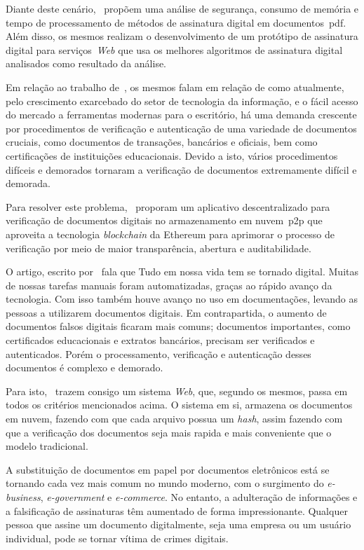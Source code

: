 Diante deste cenário,~\textcite{ramadhan2023} propõem uma análise de segurança,
consumo de memória e tempo de processamento de métodos de assinatura
digital em documentos~\acrshort{pdf}.
Além disso, os mesmos realizam o desenvolvimento de um protótipo de
assinatura digital para serviços~\textit{Web} que usa os melhores
algoritmos de assinatura digital analisados como resultado da análise.

Em relação ao trabalho de~\textcite{iman2021}, os mesmos falam em relação de
como atualmente, pelo crescimento exarcebado do setor de tecnologia da
informação, e o fácil acesso do mercado a ferramentas modernas para o
escritório, há uma demanda crescente por procedimentos de verificação e
autenticação de uma variedade de documentos cruciais, como documentos de
transações, bancários e oficiais, bem como certificações de instituições
educacionais.
Devido a isto, vários procedimentos difíceis e demorados tornaram a verificação
de documentos extremamente difícil e demorada.

Para resolver este problema,~\textcite{iman2021} proporam um aplicativo \textcite{Web}
descentralizado para verificação de documentos digitais no armazenamento em
nuvem~\acrshort{p2p} que aproveita a tecnologia \textit{blockchain} da
Ethereum para aprimorar o processo de verificação por meio de maior
transparência, abertura e auditabilidade.

O artigo, escrito por~\textcite{shree2022} fala que Tudo em nossa vida tem se
tornado digital.
Muitas de nossas tarefas manuais foram automatizadas, graças ao rápido avanço
da tecnologia.
Com isso também houve avanço no uso em documentações, levando as pessoas a
utilizarem documentos digitais.
Em contrapartida, o aumento de documentos falsos digitais ficaram mais
comuns; documentos importantes, como certificados educacionais e extratos
bancários, precisam ser verificados e autenticados.
Porém o processamento, verificação e autenticação desses documentos é complexo e
demorado.

Para isto,~\textcite{shree2022} trazem consigo um sistema \textit{Web}, que,
segundo os mesmos, passa em todos os critérios mencionados acima.
O sistema em si, armazena os documentos em nuvem, fazendo com que cada
arquivo possua um \textit{hash}\hashfootnote, assim fazendo com que a
verificação dos
documentos seja mais rapida e mais conveniente que o modelo tradicional.

A substituição de documentos em papel por documentos eletrônicos está se
tornando
cada vez mais comum no mundo moderno, com o surgimento do \textit{e-business},
\textit{e-government} e \textit{e-commerce}.
No entanto, a adulteração de informações e a falsificação de assinaturas têm
aumentado de forma impressionante.
Qualquer pessoa que assine um documento digitalmente, seja uma empresa ou um
usuário individual, pode se tornar vítima de crimes digitais\cite{
    chakraborty2016}.

